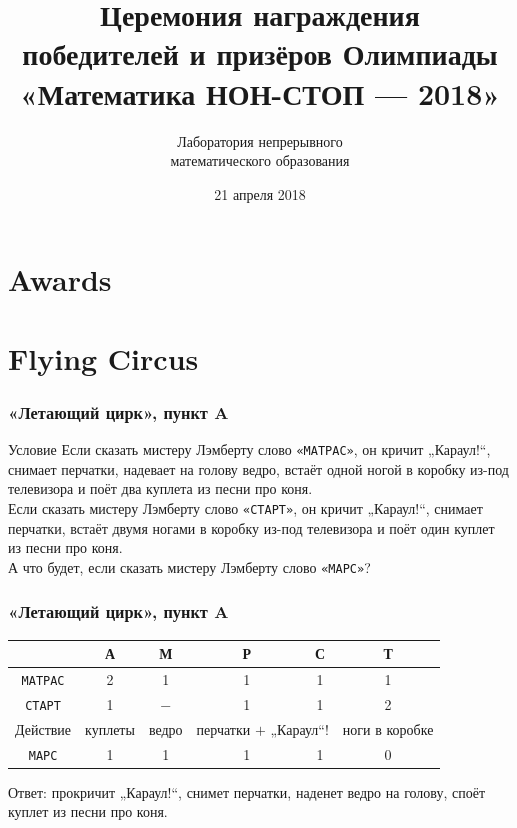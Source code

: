 \documentclass[aspectratio=1610,12pt]{beamer}
\title[«Математика НОН-СТОП — 2018», решения избранных задач]
	{\bfseries Церемония награждения \\
		победителей и призёров Олимпиады \\
		«Математика НОН-СТОП — 2018»}
\author[Оргкомитет Олимпиады]
	{Лаборатория непрерывного \\ математического образования}
\institute[\textcolor{white}{«Время науки», ЛНМО, СПбАППО}]{}
\date{21 апреля 2018}
\def\fram#1#2{\begin{frame}\frametitle{\bf #1}#2\end{frame}}
\begin{document}
\begin{frame}\titlepage\end{frame}

\section[Награждение]{Awards}
\def\nagrgroup#1#2{
	\nagrslide{#1}{#2}{похв.\,отзывы 2}
	\nagrslide{#1}{#2}{похв.\,отзывы 1}
	\nagrslide{#1}{#2}{дипломы III}
	\nagrslide{#1}{#2}{дипломы II}
	\nagrslide{#1}{#2}{дипломы I}}


\section[Летающий цирк]{Flying Circus}

\fram{«Летающий цирк», пункт A}{
\begin{block}{Условие}
Если сказать мистеру Лэмберту слово {\tt «МАТРАС»}, он кричит „Караул!“, снимает перчатки, надевает на голову ведро, встаёт одной ногой в коробку из-под телевизора и поёт два куплета из песни про коня.\medskip \\
Если сказать мистеру Лэмберту слово {\tt «СТАРТ»}, он кричит „Караул!“, снимает перчатки, встаёт двумя ногами в коробку из-под телевизора и поёт один куплет из песни про коня.\medskip \\
А что будет, если сказать мистеру Лэмберту слово {\tt «МАРС»}?
\end{block}}

\fram{«Летающий цирк», пункт A}{
\begin{center}
\begin{tabular}{|c|c|c|c|c|c|}
	\hline
	\ & А & М &\ \ \ \ Р\ \ \ \ & С & Т \\
	\hline
	{\tt МАТРАС} & 2 & 1 & 1 & 1 & 1 \\
	\hline
	{\tt СТАРТ} & 1 & − & 1 & 1 & 2 \\
	\hline
	Действие & куплеты & ведро &
		\multicolumn{2}{|c|}{перчатки $+$ „Караул“!} & ноги в коробке \\
	\hline
	{\tt МАРС} & 1 & 1 & 1 & 1 & 0 \\ \hline
\end{tabular}
\end{center} \medskip
\noindent Ответ: прокричит „Караул!“, снимет перчатки, наденет ведро на голову, споёт куплет из песни про коня.}
\end{document}
